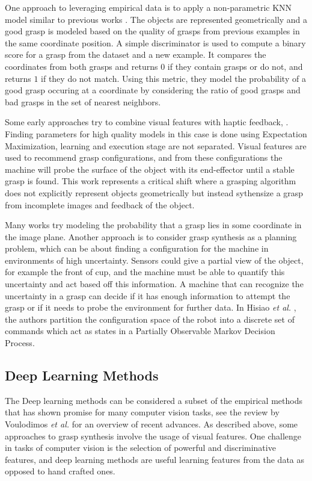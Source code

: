 \documentclass{article}
\begin{document}
One approach to leveraging empirical data is to apply a non-parametric KNN
model similar to previous works \cite{zhang11,ciocarlie14}.
The objects are represented geometrically and a good grasp is modeled based
on the quality of grasps from previous examples in the same coordinate position.
A simple discriminator is used to compute a binary score for a grasp from the
dataset and a new example. It compares the coordinates from both grasps and
returns $0$ if they contain grasps or do not, and returns $1$ if they do not
match. Using this metric, they model the probability of a good grasp occuring
at a coordinate by considering the ratio of good grasps and bad grasps in the
set of nearest neighbors.

Some early approaches try to combine visual features with haptic feedback,
\cite{piater02,coelho01}. Finding parameters for high quality models in this
case is done using Expectation Maximization, learning and execution stage
are not separated. Visual
features are used to recommend grasp configurations, and from these configurations
the machine will probe the surface of the object with its end-effector until
a stable grasp is found. This work represents a critical shift where a grasping
algorithm does not explicitly represent objects geometrically but instead
sythensize a grasp from incomplete images and feedback of the object.

Many works try modeling the probability that a grasp lies in some coordinate
in the image plane. Another approach is to consider grasp synthesis as a
planning problem, which can be about finding a configuration for the machine
in environments of high uncertainty. Sensors could
give a partial view of the object, for example the front of cup, and the machine
must be able to quantify this uncertainty and act based off this information.
A machine that can recognize the uncertainty in a grasp can decide if it has
enough information to attempt the grasp or if it needs to probe the environment
for further data. In Hisiao \textit{et al.} \cite{hsiao07}, the authors
partition the configuration space of the robot into a discrete set of commands
which act as states in a Partially Observable Markov Decision Process.

\subsection{Deep Learning Methods}
The Deep learning methods can be considered a subset of the empirical methods
that has shown promise for many computer vision tasks, see the review
by Voulodimos \textit{et al.} \cite{voulodimos18} for an overview of recent
advances. As described above, some approaches to grasp synthesis involve the
usage of visual features. One challenge in tasks of computer vision is the
selection of powerful and discriminative features, and deep learning methods
are useful learning features from the data as opposed to hand crafted ones.
\end{document}
